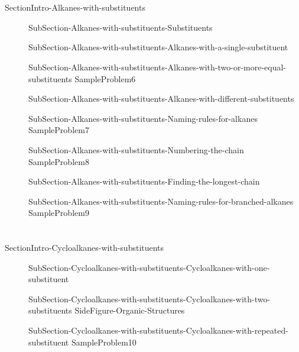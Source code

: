 \documentclass[main.tex]{subfiles}
\begin{document}
 
\section{\color{blue!30!black}{Alkanes with substituents}}
{SectionIntro-Alkanes-with-substituents}
 \newpage\vspace{10cm}{Table-Substituents}
\sloppy\begin{description}
\item[]{SubSection-Alkanes-with-substituents-Substituents}
\item[]{SubSection-Alkanes-with-substituents-Alkanes-with-a-single-substituent}
\item[]{SubSection-Alkanes-with-substituents-Alkanes-with-two-or-more-equal-substituents}
{SampleProblem6}
\item[]{SubSection-Alkanes-with-substituents-Alkanes-with-different-substituents}
\item[]{SubSection-Alkanes-with-substituents-Naming-rules-for-alkanes}
{SampleProblem7}
\item[]{SubSection-Alkanes-with-substituents-Numbering-the-chain}
{SampleProblem8}
\item[]{SubSection-Alkanes-with-substituents-Finding-the-longest-chain}
\item[]{SubSection-Alkanes-with-substituents-Naming-rules-for-branched-alkanes}
{SampleProblem9}
\end{description}




\section{\color{blue!30!black}{Cycloalkanes with substituents}}
{SectionIntro-Cycloalkanes-with-substituents}
\sloppy
\begin{description}
\item[]{SubSection-Cycloalkanes-with-substituents-Cycloalkanes-with-one-substituent}
\item[] {SubSection-Cycloalkanes-with-substituents-Cycloalkanes-with-two-substituents}
{SideFigure-Organic-Structures}

\item[]{SubSection-Cycloalkanes-with-substituents-Cycloalkanes-with-repeated-substituent}
{SampleProblem10}
\end{description}
\end{document}

